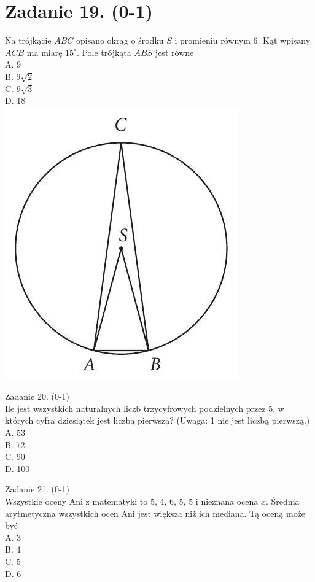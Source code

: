 \documentclass[10pt]{article}
\begin{document}
\section*{Zadanie 19. (0-1)}
Na trójkącie \(A B C\) opisano okrąg o środku \(S\) i promieniu równym 6. Kąt wpisany \(A C B\) ma miarę \(15^{\circ}\). Pole trójkąta \(A B S\) jest równe\\
A. 9\\
B. \(9 \sqrt{2}\)\\
C. \(9 \sqrt{3}\)\\
D. 18\\
\includegraphics[max width=\textwidth, center]{2024_11_21_4a1915d79134dda0750eg-08}

Zadanie 20. (0-1)\\
Ile jest wszystkich naturalnych liczb trzycyfrowych podzielnych przez 5, w których cyfra dziesiątek jest liczbą pierwszą? (Uwaga: 1 nie jest liczbą pierwszą.)\\
A. 53\\
B. 72\\
C. 90\\
D. 100

Zadanie 21. (0-1)\\
Wszystkie oceny Ani z matematyki to 5, 4, 6, 5, 5 i nieznana ocena \(x\). Średnia arytmetyczna wszystkich ocen Ani jest większa niż ich mediana. Tą oceną może być\\
A. 3\\
B. 4\\
C. 5\\
D. 6
\end{document}
